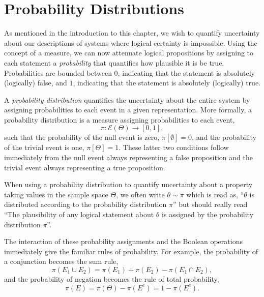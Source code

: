 \section{Probability Distributions}

As mentioned in the introduction to this chapter, we wish to quantify 
uncertainty about our descriptions of systems where logical certainty is 
impossible. Using the concept of a measure, we can now attenuate logical 
propositions by assigning to each statement a \emph{probability} that 
quantifies how plausible it is be true. Probabilities are bounded between 
$0$, indicating that the statement is absolutely (logically) false, and 
$1$, indicating that the statement is absolutely (logically) true.

A \emph{probability distribution} quantifies the uncertainty about
the entire system by assigning probabilities to each event in a
given representation.  More formally, a probability distribution is
a measure assigning probabilities to each event,
%
\begin{equation*}
\pi : \mathcal{E} \! \left( \Theta \right) \rightarrow \left[0, 1 \right],
\end{equation*}
%
such that the probability of the null event is zero, 
$\pi \! \left[ \emptyset \right] = 0$, and the probability of the trivial
event is one, $\pi \! \left[ \Theta \right] = 1$.  These latter two 
conditions follow immediately from the null event always representing
a false proposition and the trivial event always representing a
true proposition.

When using a probability distribution to quantify uncertainty about 
a property taking values in the sample space $\Theta$, we often 
write $\theta \sim \pi$ which is read as, ``$\theta$ is distributed 
according to the probability distribution $\pi$'' but should really 
read ``The plausibility of any logical statement about $\theta$ 
is assigned by the probability distribution $\pi$''.

The interaction of these probability assignments and the Boolean
operations immediately give the familiar rules of probability.  For 
example, the probability of a conjunction becomes the sum rule,
%
\begin{equation*}
\pi \! \left( E_{1} \cup E_{2} \right)
= 
\pi \! \left( E_{1} \right) + \pi \! \left( E_{2} \right)
- \pi \! \left( E_{1} \cap E_{2} \right),
\end{equation*}
%
and the probability of negation becomes the rule of total probability,
%
\begin{equation*}
\pi \! \left( E \right)
= 
\pi \! \left( \Theta \right) - \pi \! \left( E^{c} \right)
=
1 - \pi \! \left( E^{c} \right).
\end{equation*}

